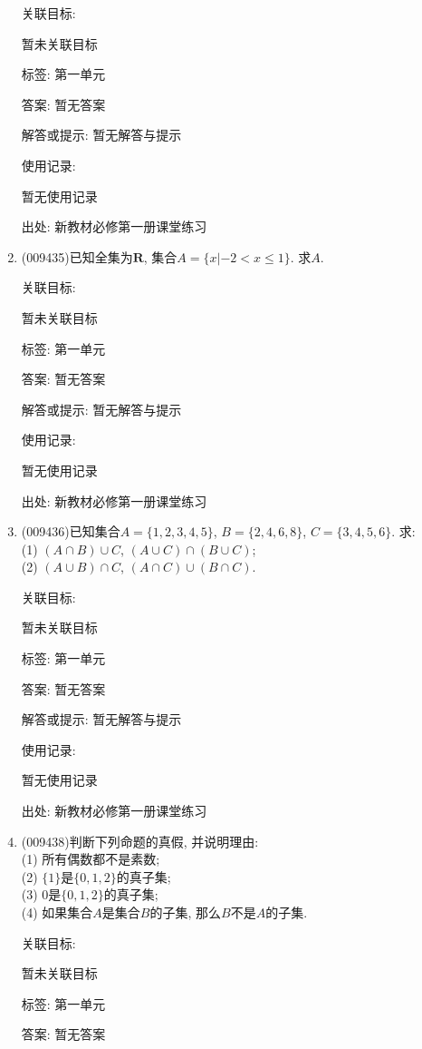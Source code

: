 \documentclass[10pt,a4paper]{article}
\begin{document}
\begin{enumerate}[1.]
关联目标:

暂未关联目标



标签: 第一单元

答案: 暂无答案

解答或提示: 暂无解答与提示

使用记录:

暂无使用记录


出处: 新教材必修第一册课堂练习
\item { (009435)}已知全集为$\mathbf{R}$, 集合$A=\{x|-2<x\le 1\}$. 求$A$.


关联目标:

暂未关联目标



标签: 第一单元

答案: 暂无答案

解答或提示: 暂无解答与提示

使用记录:

暂无使用记录


出处: 新教材必修第一册课堂练习
\item { (009436)}已知集合$A=\{1, 2, 3, 4, 5\}$, $B=\{2, 4, 6, 8\}$, $C=\{3, 4, 5, 6\}$. 求:\\
(1) $(A\cap B)\cup C$, $(A\cup C)\cap (B\cup C)$;\\
(2) $(A\cup B)\cap C$, $(A\cap C)\cup (B\cap C)$.


关联目标:

暂未关联目标



标签: 第一单元

答案: 暂无答案

解答或提示: 暂无解答与提示

使用记录:

暂无使用记录


出处: 新教材必修第一册课堂练习
\item { (009438)}判断下列命题的真假, 并说明理由:\\
(1) 所有偶数都不是素数;\\
(2) $\{1\}$是$\{0, 1, 2\}$的真子集;\\
(3) $0$是$\{0, 1, 2\}$的真子集;\\
(4) 如果集合$A$是集合$B$的子集, 那么$B$不是$A$的子集.


关联目标:

暂未关联目标



标签: 第一单元

答案: 暂无答案


\end{enumerate}
\end{document}
